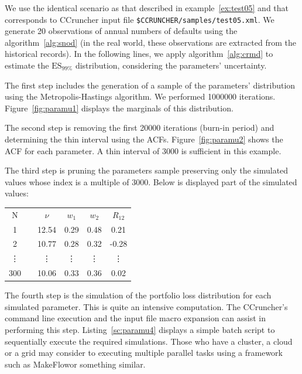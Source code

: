 \documentclass[11pt,fleqn]{book} %
\begin{document}
\begin{example}
	\label{ex:paramu}
	We use the identical scenario as that described in example~\ref{ex:test05} 
	and that corresponds to CCruncher input file 
	\texttt{\$CCRUNCHER/samples/test05.xml}. We generate 20 observations of 
	annual numbers of defaults using the algorithm~\ref{alg:snod} (in the real 
	world, these observations are extracted from the historical records). 
	In the following lines, we apply algorithm~\ref{alg:crmd} to estimate 
	the $\text{ES}_{99\%}$ distribution, considering the parameters' 
	uncertainty. 

	The first step includes the generation of a sample of the parameters' 
	distribution using the Metropolis-Hastings algorithm. We performed 
	\num{1000000} iterations. Figure~\ref{fig:paramu1} displays the 
	marginals of this distribution.
	
	The second step is removing the first \num{20000} iterations (burn-in 
	period) and determining the thin interval using the ACFs. 
	Figure~\ref{fig:paramu2} shows the ACF for each parameter. A thin interval 
	of \num{3000} is sufficient in this example. 
	
	The third step is pruning the parameters sample preserving 
	only the simulated values whose index is a multiple of \num{3000}. 
	Below is displayed part of the simulated values:

	\hspace*{1cm}
	\begin{tabular}{cc|c|c|c|c|}
		\cline{1-1} \cline{3-6}
		\multicolumn{1}{|c|}{N} & & $\nu$ & $w_1$ & $w_2$ & $R_{12}$ \\
		\cline{1-1} \cline{3-6}
		\multicolumn{1}{|c|}{1} & & 12.54 & 0.29 & 0.48 & 0.21 \\
		\cline{1-1} \cline{3-6}
		\multicolumn{1}{|c|}{2} & & 10.77 & 0.28 & 0.32 & -0.28 \\
		\cline{1-1} \cline{3-6}
		\multicolumn{1}{|c|}{\vdots} & & \vdots & \vdots & \vdots & \vdots \\
		\cline{1-1} \cline{3-6}
		\multicolumn{1}{|c|}{300} & & 10.06 & 0.33 & 0.36 & 0.02 \\
		\cline{1-1} \cline{3-6}
	\end{tabular}

	The fourth step is the simulation of the portfolio loss distribution
	for each simulated parameter. This is quite an intensive computation.
	The CCruncher's command line execution and the input file macro expansion
	can assist in performing this step. Listing~\ref{sc:paramu4} displays a 
	simple batch script to sequentially execute the required simulations.
	Those who have a cluster, a cloud or a grid may consider to executing 
	multiple parallel tasks using a framework such as MakeFlow\footnotemark[1]
	or something similar. 


\end{example}
\end{document}
